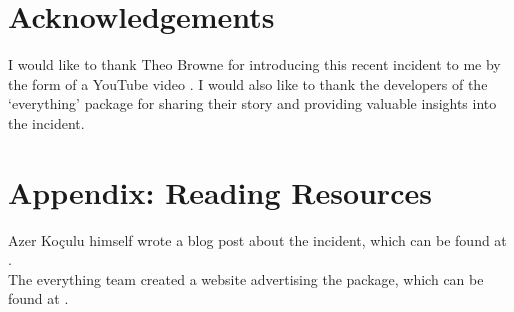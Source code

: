 \documentclass[acmsmall]{acmart}
\begin{document}
\section{Acknowledgements}
I would like to thank Theo Browne for introducing this recent incident to me by
the form of a YouTube video \cite{youtube-everything}. I would also like to
thank the developers of the `everything' package for sharing their story and
providing valuable insights into the incident.




\appendix
\section{Appendix: Reading Resources}
Azer Koçulu himself wrote a blog post about the incident, which can be found at
\cite{appendix-medium-azer}. \\
The everything team created a website advertising the package, which can be
found at \cite{appendix-everything-website}.
\end{document}
